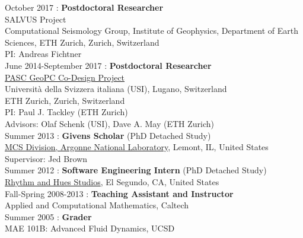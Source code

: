 \documentclass[a4paper,11pt]{article}
\begin{document}
\noindent October 2017 : \textbf{Postdoctoral Researcher}\\
\textsc{SALVUS} Project\\
Computational Seismology Group, Institute of Geophysics, Department of Earth Sciences, ETH Zurich, Zurich, Switzerland \\
PI: Andreas Fichtner \\

\noindent June 2014-September 2017 : \textbf{Postdoctoral Researcher} \\
\href{http://www.pasc-ch.org/projects/projects/geopc/}{PASC GeoPC Co-Design Project} \\
Universit\`{a} della Svizzera italiana (USI), Lugano, Switzerland \\
ETH Zurich, Zurich, Switzerland \\
PI: Paul J. Tackley (ETH Zurich) \\
Advisors: Olaf Schenk (USI), Dave A. May (ETH Zurich) \\

\noindent Summer 2013 : \textbf{Givens Scholar} (PhD Detached Study) \\
\href{http://www.mcs.anl.gov}{MCS Division, Argonne National Laboratory}, Lemont, IL, United States \\
Supervisor: Jed Brown \\

\noindent Summer 2012 : \textbf{Software Engineering Intern} (PhD Detached Study)\\
\href{http://www.rhythm.com}{Rhythm and Hues Studios},
El Segundo, CA, United States \\

\noindent Fall-Spring 2008-2013 : \textbf{Teaching Assistant and Instructor}\\
Applied and Computational Mathematics, Caltech\\

\noindent Summer 2005 : \textbf{Grader}\\
 MAE 101B: Advanced Fluid Dynamics, UCSD\\
\end{document}
